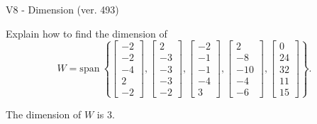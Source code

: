\begin{exercise}
  \begin{exerciseTitle}V8 - Dimension (ver. 493)\end{exerciseTitle}
  \begin{exerciseStatement}
    Explain how to find the dimension of 
\[W=\mathrm{span}\ \left\{\left[\begin{array}{r}
-2 \\
-2 \\
-4 \\
2 \\
-2
\end{array}\right] , \left[\begin{array}{r}
2 \\
-3 \\
-3 \\
-3 \\
-2
\end{array}\right] , \left[\begin{array}{r}
-2 \\
-1 \\
-1 \\
-4 \\
3
\end{array}\right] , \left[\begin{array}{r}
2 \\
-8 \\
-10 \\
-4 \\
-6
\end{array}\right] , \left[\begin{array}{r}
0 \\
24 \\
32 \\
11 \\
15
\end{array}\right]\right\}.\]



  \end{exerciseStatement}
  \begin{exerciseAnswer}
   The dimension of \(W\) is  \(3\).
  


  \end{exerciseAnswer}
\end{exercise}